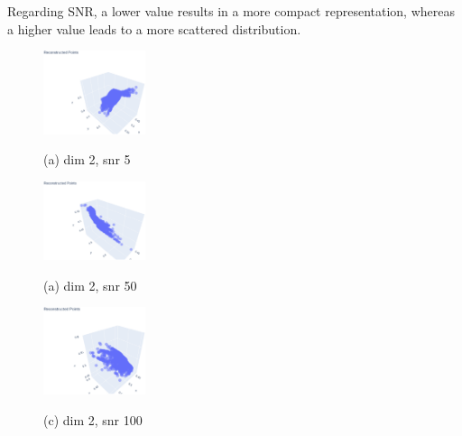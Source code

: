 \documentclass{article}
\begin{document}
Regarding SNR, a lower value results in a more compact representation, whereas a higher value leads to a more scattered distribution.
\begin{figure}[htb]
  \centering
  \begin{minipage}[b]{0.3\linewidth}
    \centering
    \includegraphics[width=3.0cm]{images/reconstructed_2_5}
    \centerline{(a) dim 2, snr 5}\medskip
  \end{minipage}
  \hfill
  \begin{minipage}[b]{0.3\linewidth}
    \centering
    \includegraphics[width=3.0cm]{images/reconstructed_2_50}
    \centerline{(a) dim 2, snr 50}\medskip
  \end{minipage}
  \hfill
  \begin{minipage}[b]{0.3\linewidth}
    \centering
    \includegraphics[width=3.0cm]{images/reconstructed_2_100}
    \centerline{(c) dim 2, snr 100}\medskip
  \end{minipage}
  
  

\end{figure}
\end{document}
